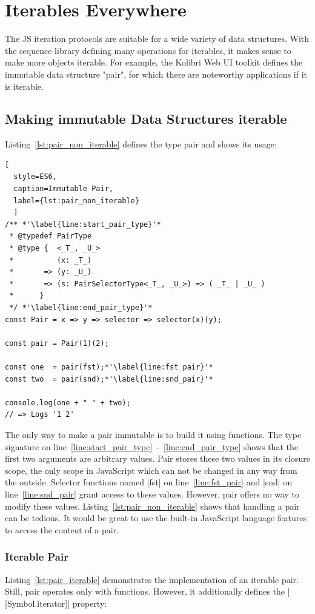 \section{Iterables Everywhere}
\label{sec:Iterables Everywhere}
The JS iteration protocols are suitable for a wide variety of data structures.
With the sequence library defining many operations for iterables, it makes
sense to make more objects iterable. For example, the Kolibri Web UI toolkit
defines the immutable data structure "pair", for which there are noteworthy
applications if it is iterable. 
\subsection{Making immutable Data Structures iterable}
\label{sub:Making immutable Data Structures iterable}
Listing~\ref{lst:pair_non_iterable} defines the type pair and shows its usage:
\begin{lstlisting}[
  style=ES6, 
  caption=Immutable Pair,
  label={lst:pair_non_iterable}
  ]
/** *'\label{line:start_pair_type}'*
 * @typedef PairType
 * @type {  <_T_, _U_>
 *          (x: _T_)
 *       => (y: _U_)
 *       => (s: PairSelectorType<_T_, _U_>) => ( _T_ | _U_ ) 
 *      }
 */ *'\label{line:end_pair_type}'*
const Pair = x => y => selector => selector(x)(y);

const pair = Pair(1)(2);

const one  = pair(fst);*'\label{line:fst_pair}'*
const two  = pair(snd);*'\label{line:snd_pair}'*

console.log(one + " " + two);
// => Logs '1 2'
\end{lstlisting}

The only way to make a pair immutable is to build it using functions. The type 
signature on line~\ref{line:start_pair_type}~-~\ref{line:end_pair_type} shows 
that the first two arguments are arbitrary values. Pair stores these two values
in its closure scope, the only scope in JavaScript which can not be changed in
any way from the outside.
Selector functions named |fst| on line~\ref{line:fst_pair} and |snd| on 
line~\ref{line:snd_pair} grant access to these values. However, pair offers
no way to modify these values. Listing~\ref{lst:pair_non_iterable} shows that
handling a pair can be tedious. It would be great to use the built-in
JavaScript language features to access the content of a pair.

\subsubsection{Iterable Pair}
\label{subsub:Iterable Pair}
Listing~\ref{lst:pair_iterable} demonstrates the implementation of an iterable 
pair. Still, pair operates only with functions. However, it additionally defines the
|[Symbol.iterator]| property:

